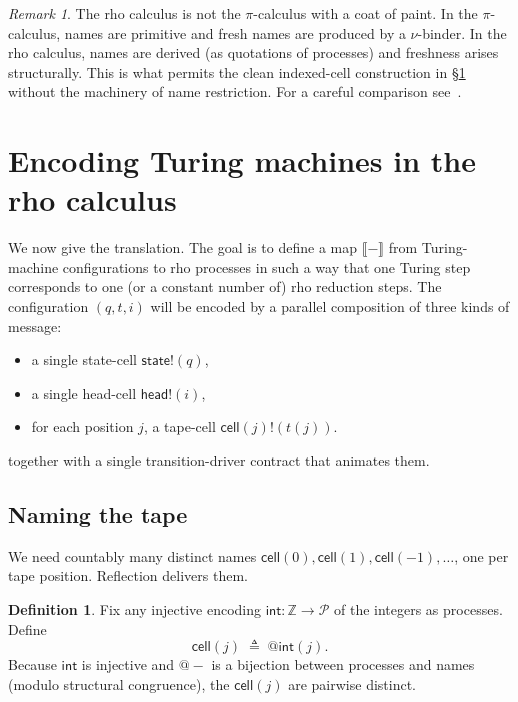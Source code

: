 \documentclass[11pt]{article}
\makeatletter
\theoremstyle{plain}
\theoremstyle{definition}
\newtheorem{definition}[theorem]{Definition}
\theoremstyle{remark}
\newtheorem{remark}[theorem]{Remark}
\newcommand{\quo}[1]{@#1}
\newcommand{\snd}[2]{#1!(#2)}
\newcommand{\sembrack}[1]{\llbracket #1 \rrbracket}
\newcommand{\Cell}{\mathsf{cell}}
\newcommand{\Head}{\mathsf{head}}
\newcommand{\St}{\mathsf{state}}
\newcommand{\Procs}{\mathcal{P}}
\makeatother
\begin{document}
\begin{remark}
The rho calculus is not the $\pi$-calculus with a coat of paint. In the
$\pi$-calculus, names are primitive and fresh names are produced by a
$\nu$-binder. In the rho calculus, names are derived (as quotations of
processes) and freshness arises structurally. This is what permits the
clean indexed-cell construction in \S\ref{sec:translation} without the
machinery of name restriction. For a careful comparison see~\cite{MeredithRadestock}.
\end{remark}

\section{Encoding Turing machines in the rho calculus}\label{sec:translation}

We now give the translation. The goal is to define a map
$\sembrack{-}$ from Turing-machine configurations to rho processes in such
a way that one Turing step corresponds to one (or a constant number of)
rho reduction steps. The configuration $(q, t, i)$ will be encoded by a
parallel composition of three kinds of message:

\begin{itemize}
\item a single state-cell $\snd{\St}{q}$,
\item a single head-cell $\snd{\Head}{i}$,
\item for each position $j$, a tape-cell $\snd{\Cell(j)}{t(j)}$.
\end{itemize}

\noindent together with a single transition-driver contract that animates
them.

\subsection{Naming the tape}

We need countably many distinct names $\Cell(0), \Cell(1), \Cell(-1), \ldots$,
one per tape position. Reflection delivers them.

\begin{definition}\label{def:cellname}
Fix any injective encoding $\mathsf{int} : \mathbb{Z} \to \Procs$ of the
integers as processes. Define
$$\Cell(j) \;\triangleq\; \quo{\mathsf{int}(j)}.$$
Because $\mathsf{int}$ is injective and $\quo{-}$ is a bijection between
processes and names (modulo structural congruence), the $\Cell(j)$ are
pairwise distinct.
\end{definition}
\end{document}
